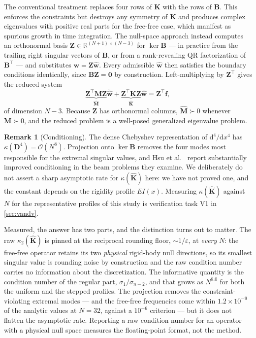 \documentclass[11pt,a4paper]{article}
\theoremstyle{definition}
\newtheorem{remark}[theorem]{Remark}
\numberwithin{equation}{section}
\newcommand{\R}{\mathbb{R}}
\newcommand{\diff}{\mathrm{d}}
\begin{document}
The conventional treatment replaces four rows of $\mathbf{K}$ with the rows of $\mathbf{B}$. This enforces the constraints but destroys any symmetry of $\mathbf{K}$ and produces complex eigenvalues with positive real parts for the free-free case, which manifest as spurious growth in time integration. The null-space approach \cite{hsu2018} instead computes an orthonormal basis $\mathbf{Z} \in \R^{(N+1) \times (N-3)}$ for $\ker \mathbf{B}$ --- in practice from the trailing right singular vectors of $\mathbf{B}$, or from a rank-revealing QR factorization of $\mathbf{B}^{\!\top}$ --- and substitutes $\mathbf{w} = \mathbf{Z}\hat{\mathbf{w}}$. Every admissible $\hat{\mathbf{w}}$ then satisfies the boundary conditions identically, since $\mathbf{B}\mathbf{Z} = \mathbf{0}$ by construction. Left-multiplying by $\mathbf{Z}^{\!\top}$ gives the reduced system
\begin{equation}
\label{eq:reduced}
\underbrace{\mathbf{Z}^{\!\top}\mathbf{M}\mathbf{Z}}_{\hat{\mathbf{M}}} \ddot{\hat{\mathbf{w}}}
+ \underbrace{\mathbf{Z}^{\!\top}\mathbf{K}\mathbf{Z}}_{\hat{\mathbf{K}}} \hat{\mathbf{w}}
= \mathbf{Z}^{\!\top}\mathbf{f},
\end{equation}
of dimension $N-3$. Because $\mathbf{Z}$ has orthonormal columns, $\hat{\mathbf{M}} \succ 0$ whenever $\mathbf{M} \succ 0$, and the reduced problem is a well-posed generalized eigenvalue problem.

\begin{remark}[Conditioning]
\label{rem:conditioning}
The dense Chebyshev representation of $\diff^4/\diff x^4$ has $\kappa(\mathbf{D}^4) = \mathcal{O}(N^8)$. Projection onto $\ker \mathbf{B}$ removes the four modes most responsible for the extremal singular values, and Hsu et al.\ \cite{hsu2018} report substantially improved conditioning in the beam problems they examine. We deliberately do not assert a sharp asymptotic rate for $\kappa(\hat{\mathbf{K}})$ here: we have not proved one, and the constant depends on the rigidity profile $EI(x)$. Measuring $\kappa(\hat{\mathbf{K}})$ against $N$ for the representative profiles of this study is verification task V1 in \cref{sec:vandv}.

Measured, the answer has two parts, and the distinction turns out to matter. The raw $\kappa_2(\hat{\mathbf{K}})$ is pinned at the reciprocal rounding floor, $\sim 1/\varepsilon$, at \emph{every} $N$: the free-free operator retains its two \emph{physical} rigid-body null directions, so its smallest singular value is rounding noise by construction and the raw condition number carries no information about the discretization. The informative quantity is the condition number of the regular part, $\sigma_1/\sigma_{n-2}$, and that grows as $N^{8.0}$ for both the uniform and the stepped profiles. The projection removes the constraint-violating extremal modes --- and the free-free frequencies come within $1.2\times10^{-9}$ of the analytic values at $N=32$, against a $10^{-6}$ criterion --- but it does not flatten the asymptotic rate. Reporting a raw condition number for an operator with a physical null space measures the floating-point format, not the method.
\end{remark}
\end{document}
